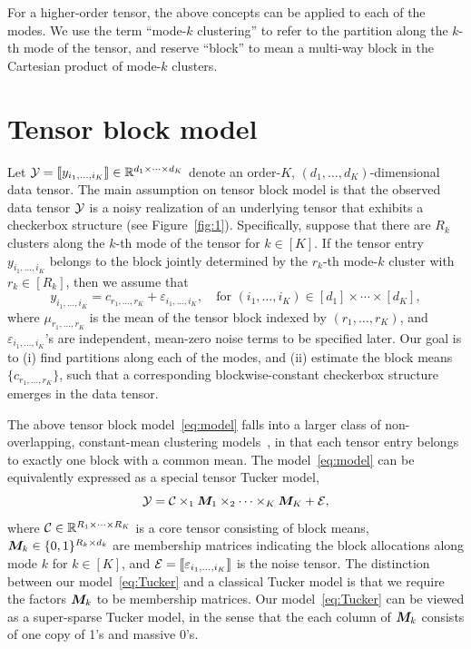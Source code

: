 \documentclass{article}
\begin{document}
For a higher-order tensor, the above concepts can be applied to each of the modes. We use the term ``mode-$k$ clustering'' to refer to the partition along the $k$-th mode of the tensor, and reserve ``block'' to mean a multi-way block in the Cartesian product of mode-$k$ clusters. 

\section{Tensor block model}
Let $\mathcal{Y}=\llbracket y_{i_1,\ldots,i_K} \rrbracket\in\mathbb{R}^{d_1\times \cdots\times d_K}$ denote an order-$K$, $(d_1,\ldots,d_K)$-dimensional data tensor. The main assumption on tensor block model is that the observed data tensor $\mathcal{Y}$ is a noisy realization of an underlying tensor that exhibits a checkerbox structure (see Figure~\ref{fig:1}). Specifically, suppose that there are $R_k$ clusters along the $k$-th mode of the tensor for $k\in[K]$. If the tensor entry $y_{i_1,\ldots,i_K}$ belongs to the block jointly determined by the $r_k$-th mode-$k$ cluster with $r_k\in[R_k]$, then we assume that 
\begin{equation}\label{eq:model}
y_{i_1,\ldots,i_K}=c_{r_1,\ldots,r_K}+\varepsilon_{i_1,\ldots,i_K},\quad \text{for }(i_1,\ldots,i_K)\in[d_1]\times\cdots\times [d_K],
\end{equation}
where $\mu_{r_1,\ldots,r_K}$ is the mean of the tensor block indexed by $(r_1,\ldots,r_K)$, and $\varepsilon_{i_1,\ldots,i_K}$'s are independent, mean-zero noise terms to be specified later. Our goal is to (i) find partitions along each of the modes, and (ii) estimate the block means $\{c_{r_1,\ldots,r_K}\}$, such that a corresponding blockwise-constant checkerbox structure emerges in the data tensor. 

The above tensor block model~\eqref{eq:model} falls into a larger class of non-overlapping, constant-mean clustering models~\cite{madeira2004biclustering}, in that each tensor entry belongs to exactly one block with a common mean. The model~\eqref{eq:model} can be equivalently expressed as a special tensor Tucker model,
\begin{equation}\label{eq:Tucker}
\mathcal{Y}=\mathcal{C}\times_1\bm M_1\times_2\cdots \times_K \bm M_K+\mathcal{E},
\end{equation}
where $\mathcal{C}\in\mathbb{R}^{R_1\times\cdots\times R_K}$ is a core tensor consisting of block means, $\bm M_k \in\{0,1\}^{R_k\times d_k}$ are membership matrices indicating the block allocations along mode $k$ for $k\in[K]$, and $\mathcal{E}=\llbracket \varepsilon_{i_1,\ldots,i_K} \rrbracket$ is the noise tensor. The distinction between our model~\eqref{eq:Tucker} and a classical Tucker model is that we require the factors $\bm M_k$ to be membership matrices. Our model~\eqref{eq:Tucker} can be viewed as a super-sparse Tucker model, in the sense that the each column of $\bm M_k$ consists of one copy of 1's and massive 0's. 
\end{document}
